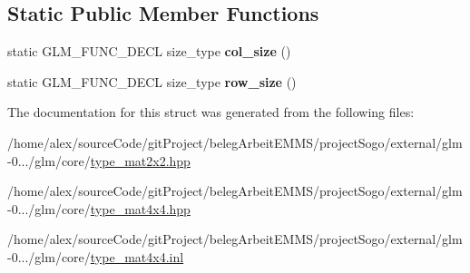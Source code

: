 \subsection*{Static Public Member Functions}
\begin{DoxyCompactItemize}
\item 
\hypertarget{structglm_1_1detail_1_1tmat4x4_a57091662d941e6be38879601c7a86b7a}{static G\-L\-M\-\_\-\-F\-U\-N\-C\-\_\-\-D\-E\-C\-L size\-\_\-type {\bfseries col\-\_\-size} ()}\label{structglm_1_1detail_1_1tmat4x4_a57091662d941e6be38879601c7a86b7a}

\item 
\hypertarget{structglm_1_1detail_1_1tmat4x4_a7c94ace6f65d34db4e01b21148a92d82}{static G\-L\-M\-\_\-\-F\-U\-N\-C\-\_\-\-D\-E\-C\-L size\-\_\-type {\bfseries row\-\_\-size} ()}\label{structglm_1_1detail_1_1tmat4x4_a7c94ace6f65d34db4e01b21148a92d82}

\end{DoxyCompactItemize}


The documentation for this struct was generated from the following files\-:\begin{DoxyCompactItemize}
\item 
/home/alex/source\-Code/git\-Project/beleg\-Arbeit\-E\-M\-M\-S/project\-Sogo/external/glm-\/0.../glm/core/\hyperlink{type__mat2x2_8hpp}{type\-\_\-mat2x2.\-hpp}\item 
/home/alex/source\-Code/git\-Project/beleg\-Arbeit\-E\-M\-M\-S/project\-Sogo/external/glm-\/0.../glm/core/\hyperlink{type__mat4x4_8hpp}{type\-\_\-mat4x4.\-hpp}\item 
/home/alex/source\-Code/git\-Project/beleg\-Arbeit\-E\-M\-M\-S/project\-Sogo/external/glm-\/0.../glm/core/\hyperlink{type__mat4x4_8inl}{type\-\_\-mat4x4.\-inl}\end{DoxyCompactItemize}
